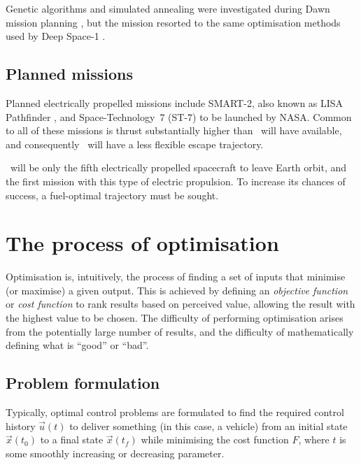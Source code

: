 Genetic algorithms and simulated annealing were investigated during Dawn mission planning \parencite{Lee2005a}, but the mission resorted to the same optimisation methods used by Deep Space-1 \parencite{Rayman2007}.

\subsection{Planned missions}
Planned electrically propelled missions include SMART-2, also known as LISA Pathfinder \parencite{web_SMART-2}, and Space-Technology~7 (ST-7) to be launched by NASA. Common to all of these missions is thrust substantially higher than \BW\ will have available, and consequently \BW\ will have a less flexible escape trajectory.

\BW\ will be only the fifth electrically propelled spacecraft to leave Earth orbit, and the first mission with this type of electric propulsion.
To increase its chances of success, a fuel-optimal trajectory must be sought.



\section{The process of optimisation} \label{sec:Optimisation-methods}

Optimisation is, intuitively, the process of finding a set of inputs that minimise (or maximise) a given output. This is achieved by defining an \emph{objective function} or \emph{cost function} to rank results based on perceived value, allowing the result with the highest value to be chosen. The difficulty of performing optimisation arises from the potentially large number of results, and the difficulty of mathematically defining what is \enquote{good} or \enquote{bad}. 

\subsection{Problem formulation} \label{sub:Formulation}

Typically, optimal control problems are formulated to find the required control history $\vec{u}(t)$ to deliver something (in this case, a vehicle) from an initial state $\vec{x}(t_0)$ to a final state $\vec{x}(t_f)$ while minimising the cost function $F$, where $t$ is some smoothly increasing or decreasing parameter. 

